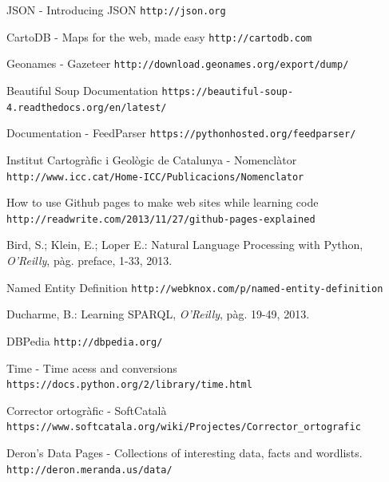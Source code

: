 \documentclass[12pt,a4paper,openright,oneside]{article}
\numberwithin{equation}{section}
\theoremstyle{definition}
\begin{document}
\begin{thebibliography}{50}
 JSON - Introducing JSON
\newline \texttt{http://json.org}

 CartoDB - Maps for the web, made easy
\newline \texttt{http://cartodb.com}

 Geonames - Gazeteer
\newline \texttt{http://download.geonames.org/export/dump/}

 Beautiful Soup Documentation
\newline \texttt{https://beautiful-soup-4.readthedocs.org/en/latest/}

 Documentation - FeedParser
\newline \texttt{https://pythonhosted.org/feedparser/}

 Institut Cartogràfic i Geològic de Catalunya - Nomenclàtor
\newline \texttt{http://www.icc.cat/Home-ICC/Publicacions/Nomenclator}

 How to use Github pages to make web sites while learning code
\newline \texttt{http://readwrite.com/2013/11/27/github-pages-explained}

 Bird, S.; Klein, E.; Loper E.: Natural Language Processing with Python, \textit{O'Reilly}, pàg. preface, 1-33, 2013.

 Named Entity Definition
\newline \texttt{http://webknox.com/p/named-entity-definition}

 Ducharme, B.: Learning SPARQL, \textit{O'Reilly}, pàg. 19-49, 2013.

 DBPedia
\newline \texttt{http://dbpedia.org/}

 Time - Time acess and conversions
\newline \texttt{https://docs.python.org/2/library/time.html}

 Corrector ortogràfic - SoftCatalà
\newline \texttt{https://www.softcatala.org/wiki/Projectes/Corrector\_ortografic}

 Deron's Data Pages - Collections of interesting data, facts and wordlists.
\newline \texttt{http://deron.meranda.us/data/}


\end{thebibliography}
\end{document}
